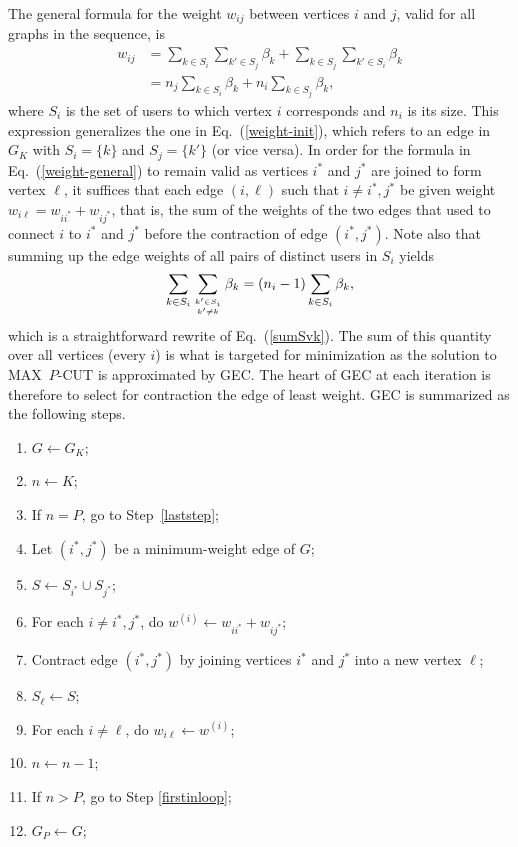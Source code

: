 \documentclass[]{IEEEtran}
\begin{document}
The general formula for the weight $w_{ij}$ between vertices $i$ and $j$, valid
for all graphs in the sequence, is
\begin{align}
w_{ij}
&= \sum_{k\in S_i}\sum_{k'\in S_j}\beta_k+
\sum_{k\in S_j}\sum_{k'\in S_i}\beta_k \\
&= n_j\sum_{k\in S_i}\beta_k+
n_i\sum_{k\in S_j}\beta_k,
\label{weight-general}
\end{align}
where $S_i$ is the set of users to which vertex $i$ corresponds and $n_i$ is its
size. This expression generalizes the one in Eq.~(\ref{weight-init}), which
refers to an edge in $G_K$ with $S_i=\{k\}$ and $S_j=\{k'\}$ (or vice versa). In
order for the formula in Eq.~(\ref{weight-general}) to remain valid as vertices
$i^*$ and $j^*$ are joined to form vertex $\ell$, it suffices that each edge
$(i,\ell)$ such that $i\neq i^*,j^*$ be given weight
$w_{i\ell}=w_{ii^*}+w_{ij^*}$, that is, the sum of the weights of the two edges
that used to connect $i$ to $i^*$ and $j^*$ before the contraction of edge
$(i^*,j^*)$. Note also that summing up the edge weights of all pairs of distinct
users in $S_i$ yields
\begin{equation}
\sum_{k\in S_i}\sum_{\genfrac{}{}{0pt}{}{k'\in S_i}{k'\neq k}}\beta_k=
(n_i-1)\sum_{k\in S_i}\beta_k,
\label{contamination}
\end{equation}
which is a straightforward rewrite of Eq.~(\ref{sumSvk}). The sum of this
quantity over all vertices (every $i$) is what is targeted for minimization as
the solution to MAX~$P$-CUT is approximated by GEC. The heart of GEC at each
iteration is therefore to select for contraction the edge of least weight. GEC
is summarized as the following steps.
\begin{enumerate}
\item{}
$G\leftarrow G_K$;
\item{}
$n\leftarrow K$;
\item{}\label{jump}
If $n=P$, go to Step~\ref{laststep};
\item{}\label{firstinloop}
Let $(i^*,j^*)$ be a minimum-weight edge of $G$;
\item{}
$S\leftarrow S_{i^*}\cup S_{j^*}$;
\item{}\label{cost2a}
For each $i\neq i^*,j^*$, do $w^{(i)}\leftarrow w_{ii^*}+w_{ij^*}$;
\item{}
Contract edge $(i^*,j^*)$ by joining vertices $i^*$ and $j^*$ into a new
vertex $\ell$;
\item{}
$S_\ell\leftarrow S$;
\item{}\label{cost2b}
For each $i\neq\ell$, do $w_{i\ell}\leftarrow w^{(i)}$;
\item{}
$n\leftarrow n-1$;
\item{}\label{lastinloop}
If $n>P$, go to Step \ref{firstinloop};
\item{}\label{laststep}
$G_P\leftarrow G$;
\end{enumerate}
\end{document}

